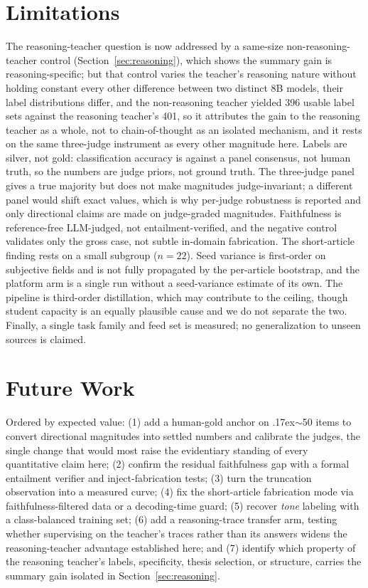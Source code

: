 \documentclass[10pt,journal]{IEEEtran}
\begin{document}
\section{Limitations}\label{sec:limits}
The reasoning-teacher question is now addressed by a same-size non-reasoning-teacher control (Section~\ref{sec:reasoning}), which shows the summary gain is reasoning-specific; but that control varies the teacher's reasoning nature without holding constant every other difference between two distinct 8B models, their label distributions differ, and the non-reasoning teacher yielded 396 usable label sets against the reasoning teacher's 401, so it attributes the gain to the reasoning teacher as a whole, not to chain-of-thought as an isolated mechanism, and it rests on the same three-judge instrument as every other magnitude here. Labels are silver, not gold: classification accuracy is against a panel consensus, not human truth, so the numbers are judge priors, not ground truth. The three-judge panel gives a true majority but does not make magnitudes judge-invariant; a different panel would shift exact values, which is why per-judge robustness is reported and only directional claims are made on judge-graded magnitudes. Faithfulness is reference-free LLM-judged, not entailment-verified, and the negative control validates only the gross case, not subtle in-domain fabrication. The short-article finding rests on a small subgroup ($n=22$). Seed variance is first-order on subjective fields and is not fully propagated by the per-article bootstrap, and the platform arm is a single run without a seed-variance estimate of its own. The pipeline is third-order distillation, which may contribute to the ceiling, though student capacity is an equally plausible cause and we do not separate the two. Finally, a single task family and feed set is measured; no generalization to unseen sources is claimed.

\section{Future Work}\label{sec:future}
Ordered by expected value: (1) add a human-gold anchor on {\raise.17ex\hbox{$\scriptstyle\sim$}}50 items to convert directional magnitudes into settled numbers and calibrate the judges, the single change that would most raise the evidentiary standing of every quantitative claim here; (2) confirm the residual faithfulness gap with a formal entailment verifier and inject-fabrication tests; (3) turn the truncation observation into a measured curve; (4) fix the short-article fabrication mode via faithfulness-filtered data or a decoding-time guard; (5) recover \emph{tone} labeling with a class-balanced training set; (6) add a reasoning-trace transfer arm, testing whether supervising on the teacher's traces rather than its answers widens the reasoning-teacher advantage established here; and (7) identify which property of the reasoning teacher's labels, specificity, thesis selection, or structure, carries the summary gain isolated in Section~\ref{sec:reasoning}.
\end{document}

